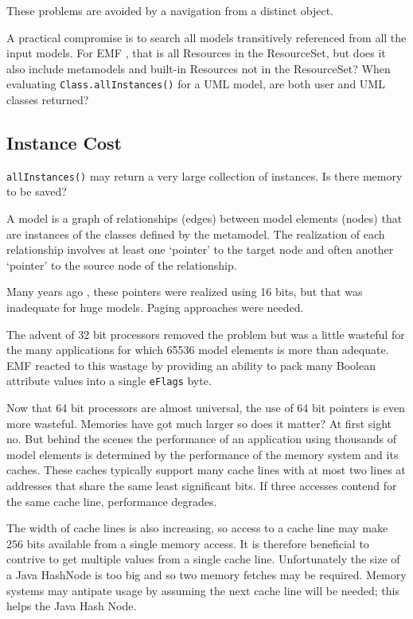 \documentclass[
]{ceurart}
\begin{document}
These problems are avoided by a navigation from a distinct object.

A practical compromise is to search all models transitively referenced from all the input models. For EMF \cite{Eclipse-EMF}, that is all Resources in the ResourceSet, but does it also include metamodels and built-in Resources not in the ResourceSet? When evaluating \verb!Class.allInstances()! for a UML model, are both user and UML classes returned?

\subsection{Instance Cost}

\verb!allInstances()! may return a very large collection of instances. Is there memory to be saved?

A model is a graph of relationships (edges) between model elements (nodes) that are instances of the classes defined by the metamodel. The realization of each relationship involves at least one `pointer' to the target node and often another `pointer' to the source node of the relationship.

Many years ago , these pointers were realized using 16 bits, but that was inadequate for huge models. Paging approaches were needed.

The advent of 32 bit processors removed the problem but was a little wasteful for the many applications for which 65536 model elements is more than adequate. EMF reacted to this wastage by providing an ability to pack many Boolean attribute values into a single \verb!eFlags! byte. 

Now that 64 bit processors are almost universal, the use of 64 bit pointers is even more wasteful. Memories have got much larger so does it matter? At first sight no. But behind the scenes the performance of an application using thousands of model elements is determined by the performance of the memory system and its caches. These caches typically support many cache lines with at most two lines at addresses that share the same least significant bits. If three accesses contend for the same cache line, performance degrades.

The width of cache lines is also increasing, so access to a cache line may make 256 bits available from a single memory access. It is therefore beneficial to contrive to get multiple values from a single cache line. Unfortunately the size of a Java HashNode is too big and so two memory fetches may be required. Memory systems may antipate usage by assuming the next cache line will be needed; this helps the Java Hash Node.
\end{document}
